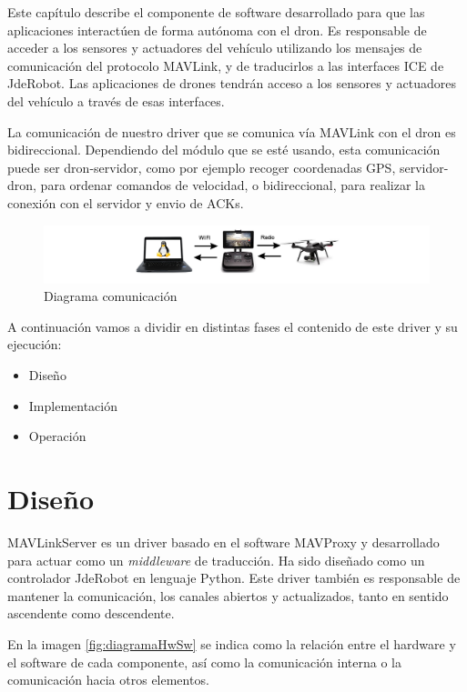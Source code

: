 Este capítulo describe el componente de software desarrollado para que las aplicaciones interactúen de forma autónoma con el dron. Es responsable de acceder a los sensores y actuadores del vehículo utilizando los mensajes de comunicación del protocolo MAVLink, y de traducirlos a las interfaces ICE de JdeRobot. Las aplicaciones de drones tendrán acceso a los sensores y actuadores del vehículo a través de esas interfaces.

La comunicación de nuestro driver que se comunica vía MAVLink con el dron es bidireccional. Dependiendo del módulo que se esté usando, esta comunicación puede ser dron-servidor, como por ejemplo recoger coordenadas GPS, servidor-dron, para ordenar comandos de velocidad, o bidireccional, para realizar la conexión con el servidor y envio de ACKs. 

\begin{figure}[H]
  \hspace*{-3.5cm}
  \includegraphics[scale=0.5]{imagenes/muySencillo.png}
  \caption{Diagrama comunicación}
  \label{fig:diagramaComunicacionServerDron1}
\end{figure}


A continuación vamos a dividir en distintas fases el contenido de este driver y su ejecución:

\begin{itemize}
\item Diseño
\item Implementación
\item Operación
\end{itemize}

\section{Diseño}
\label{Diseno}
MAVLinkServer es un driver basado en el software MAVProxy y desarrollado para actuar como un \textit{middleware} de traducción. Ha sido diseñado como un controlador JdeRobot en lenguaje Python. Este driver también es responsable de mantener la comunicación, los canales abiertos y actualizados, tanto en sentido ascendente como descendente. 

En la imagen \ref{fig:diagramaHwSw} se indica como la relación entre el hardware y el software de cada componente, así como la comunicación interna o la comunicación hacia otros elementos.


